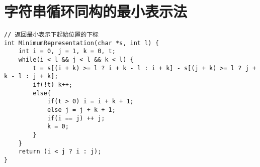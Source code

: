 \section{字符串循环同构的最小表示法}
\begin{verbatim}
// 返回最小表示下起始位置的下标
int MinimumRepresentation(char *s, int l) {  
    int i = 0, j = 1, k = 0, t;  
    while(i < l && j < l && k < l) {  
        t = s[(i + k) >= l ? i + k - l : i + k] - s[(j + k) >= l ? j + k - l : j + k];  
        if(!t) k++;  
        else{  
            if(t > 0) i = i + k + 1;  
            else j = j + k + 1;  
            if(i == j) ++ j;  
            k = 0;  
        }  
    }  
    return (i < j ? i : j);  
}  
\end{verbatim}